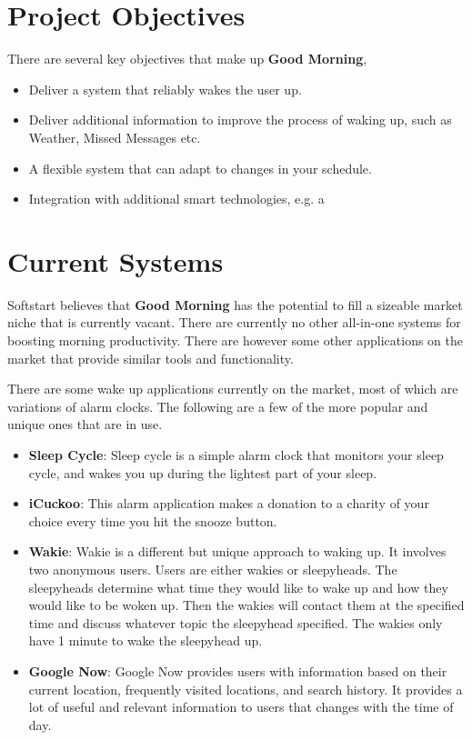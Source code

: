 \documentclass[11pt]{article}
\begin{document}

%
\section{Project Objectives}\label{project-objectives}

There are several key objectives that make up \textbf{Good Morning},

\begin{itemize}
\item
  Deliver a system that reliably wakes the user up.
\item
  Deliver additional information to improve the process of waking up, such as Weather, Missed Messages etc.
\item
  A flexible system that can adapt to changes in your schedule.
\item
  Integration with additional smart technologies, e.g. a 
\end{itemize}


%
\section{Current Systems}\label{current-systems}

Softstart believes that \textbf{Good Morning} has the potential to fill a sizeable market niche that is currently vacant. There are currently no other all-in-one systems for boosting morning productivity. There are however some other applications on the market that provide similar tools and functionality.

There are some wake up applications currently on the market, most of which are variations of alarm clocks. The following are a few of the more popular and unique ones that are in use.
\begin{itemize}
\item
    \textbf{Sleep Cycle}: Sleep cycle is a simple alarm clock that monitors your sleep cycle, and wakes you up during the lightest part of your sleep.
\item
    \textbf{iCuckoo}: This alarm application makes a donation to a charity of your choice every time you hit the snooze button.
\item
    \textbf{Wakie}: Wakie is a different but unique approach to waking up. It involves two anonymous users. Users are either wakies or sleepyheads. The sleepyheads determine what time they would like to wake up and how they would like to be woken up. Then the wakies will contact them at the specified time and discuss whatever topic the sleepyhead specified. The wakies only have 1 minute to wake the sleepyhead up.
\item
	\textbf{Google Now}: Google Now provides users with information based on their current location, frequently visited locations, and search history. It provides a lot of useful and relevant information to users that changes with the time of day.
\end{itemize}
\end{document}
